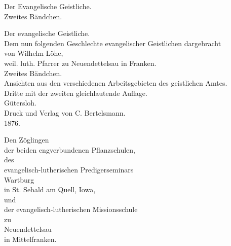 \begin{center}
{\Large Der Evangelische Geistliche.}\\[1.5em]
{\Large Zweites Bändchen.}
\end{center}


\clearpage
\begin{center}
{\LARGE Der evangelische Geistliche.}\\[1.5em]
Dem nun folgenden Geschlechte evangelischer Geistlichen dargebracht\\[1.5em]
von Wilhelm Löhe,\\
weil. luth. Pfarrer zu Neuendettelsau in Franken.\\[1.5em]
{\Large Zweites Bändchen.}\\[1em]
Ansichten aus den verschiedenen Arbeitsgebieten des geistlichen Amtes.\\[1.5em]
Dritte mit der zweiten gleichlautende Auflage.\\[1.5em]
Gütersloh.\\
Druck und Verlag von C. Bertelsmann.\\
1876.
\end{center}


\clearpage
\begin{center}
Den Zöglingen\\
der beiden engverbundenen Pflanzschulen,\\
des\\
evangelisch-lutherischen Predigerseminars\\
Wartburg\\
in St. Sebald am Quell, Iowa,\\
und\\
der evangelisch-lutherischen Missionsschule\\
zu\\
Neuendettelsau\\
in Mittelfranken.
\end{center}


